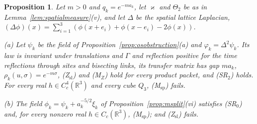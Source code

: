\documentclass[aps,prd,twocolumn,superscriptaddress,nofootinbib,longbibliography,floatfix,amsmath,amssymb,10pt]{revtex4-2}
\newtheorem{proposition}[theorem]{Proposition}
\theoremstyle{definition}
\theoremstyle{remark}
\newcommand{\R}{\mathbb{R}}
\begin{document}
\begin{proposition}\label{prop:rpexamples}
Let $m>0$ and $q_k=e^{-ma_k}$, let $\varkappa$ and $\Theta_2$ be as in
Lemma~\textup{\ref{lem:spatialmeasure}(v)}, and let $\Delta$ be the
spatial lattice Laplacian, $(\Delta\phi)(x)=\sum_{i=1}^3(\phi(x+e_i)+
\phi(x-e_i)-2\phi(x))$.

\textup{(a)} Let $\psi_k$ be the field of
Proposition~\textup{\ref{prop:osobstruction}(a)} and $\varphi_k=\Delta^2
\psi_k$. Its law is invariant under translations and $\Gamma$ and reflection
positive for the time reflections through sites and bisecting links, its
transfer matrix has gap $ma_k$, $\rho_k(u,\sigma)=e^{-m\sigma}$,
\textup{(Z$_{\mathrm{sl}}$)} and \textup{(M$_Z$)} hold for every product
packet, and \textup{(SR$_2$)} holds. For every real $h\in C^4_c(\R^3)$ and
every cube $Q_3$, \textup{(M$_{\mathrm{sp}}$)} fails.

\textup{(b)} The field $\phi_k=\psi_k+a_k^{-5/2}\xi_k$ of
Proposition~\textup{\ref{prop:msplit}(vi)} satisfies \textup{(SR$_0$)} and,
for every nonzero real $h\in C_c(\R^3)$, \textup{(M$_{\mathrm{sp}}$)}; and
\textup{(Z$_{\mathrm{sl}}$)} fails.
\end{proposition}
\end{document}
